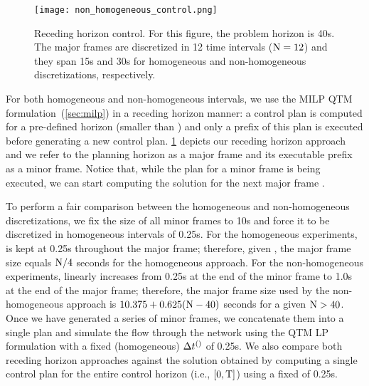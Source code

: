 \begin{figure*}[t!]
\centering
\texttt{[image: non\_homogeneous\_control.png]}
\caption{Receding horizon control. For this figure, the problem horizon \TMAX
is 40s. The major frames are discretized in 12 time intervals ($\Nn = 12$) and
they span 15s and 30s for homogeneous and non-homogeneous discretizations,
respectively.}
\label{fig:multiplan}
\end{figure*}


For both homogeneous and non-homogeneous intervals, we use the MILP QTM
formulation~(\cref{sec:milp}) in a receding horizon manner: a control plan is
computed for a pre-defined horizon (smaller than \TMAX) and only a prefix of
this plan is executed before generating a new control plan. 
%
\cref{fig:multiplan} depicts our receding horizon approach and we refer to the
planning horizon as a major frame and its executable prefix as a minor frame.
%
Notice that, while the plan for a minor frame is being executed, we can start
computing the solution for the next major frame .


To perform a fair comparison between the homogeneous and non-homogeneous
discretizations, we fix the size of all minor frames to 10s and force it to be
discretized in homogeneous intervals of 0.25s.
%
For the homogeneous experiments, \DT[] is kept at 0.25s throughout the major
frame; therefore, given \Nn, the major frame size equals $\Nn/4$ seconds for the
homogeneous approach.
%
For the non-homogeneous experiments, \DT[] linearly increases from
0.25s at the end of the minor frame to 1.0s at the end of the major frame;
therefore, the major frame size used by the non-homogeneous approach
is $10.375 + 0.625(\Nn-40)$ seconds for a given $\Nn > 40$.
%
%
Once we have generated a series of minor frames, we concatenate them into a
single plan and simulate the flow through the network using the QTM LP
formulation with a fixed (homogeneous) $\DT[]$ of 0.25s.
%
%
We also compare both receding horizon approaches against the
 solution obtained by computing a single control plan
for the entire control horizon (i.e., $[0,\TMAX]$) using a fixed \DT[] of 0.25s.



